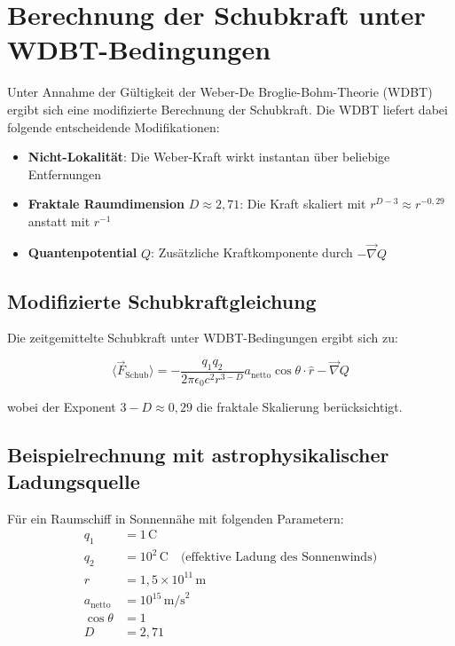 \documentclass[11pt, a4paper]{article}
\begin{document}
\section{Berechnung der Schubkraft unter WDBT-Bedingungen}
\label{sec:schubkraft-wdbt}

Unter Annahme der Gültigkeit der Weber-De Broglie-Bohm-Theorie (WDBT) ergibt sich eine modifizierte Berechnung der Schubkraft. Die WDBT liefert dabei folgende entscheidende Modifikationen:

\begin{itemize}
\item \textbf{Nicht-Lokalität}: Die Weber-Kraft wirkt instantan über beliebige Entfernungen
\item \textbf{Fraktale Raumdimension} $D \approx 2,71$: Die Kraft skaliert mit $r^{D-3} \approx r^{-0,29}$ anstatt mit $r^{-1}$
\item \textbf{Quantenpotential} $Q$: Zusätzliche Kraftkomponente durch $-\vec{\nabla} Q$
\end{itemize}

\subsection{Modifizierte Schubkraftgleichung}

Die zeitgemittelte Schubkraft unter WDBT-Bedingungen ergibt sich zu:

\[
\langle \vec{F}_{\text{Schub}} \rangle = -\frac{q_1 q_2}{2\pi \epsilon_0 c^2 r^{3-D}} a_{\text{netto}} \cos \theta \cdot \hat{r} - \vec{\nabla} Q
\]

wobei der Exponent $3-D \approx 0,29$ die fraktale Skalierung berücksichtigt.

\subsection{Beispielrechnung mit astrophysikalischer Ladungsquelle}

Für ein Raumschiff in Sonnennähe mit folgenden Parametern:
\begin{align*}
q_1 &= 1\,\text{C} \\
q_2 &= 10^2\,\text{C} \quad \text{(effektive Ladung des Sonnenwinds)} \\
r &= 1,5 \times 10^{11}\,\text{m} \\
a_{\text{netto}} &= 10^{15}\,\text{m/s}^2 \\
\cos \theta &= 1 \\
D &= 2,71
\end{align*}
\end{document}
